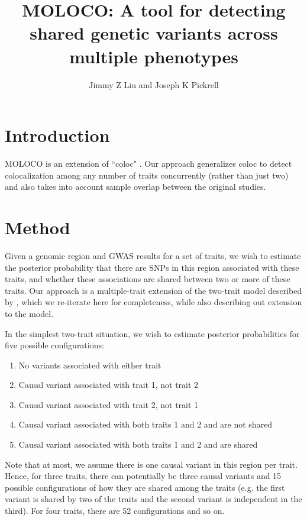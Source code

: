 \documentclass{article}
\begin{document}
\title{MOLOCO: A tool for detecting shared genetic variants across multiple phenotypes}
\author{Jimmy Z Liu and Joseph K Pickrell}
\maketitle


\section{Introduction}
MOLOCO is an extension of ``coloc" \citep{Giambartolomei:2014aa}. Our approach generalizes coloc to detect colocalization among any number of traits concurrently (rather than just two) and also takes into account sample overlap between the original studies.


\section{Method}

Given a genomic region and GWAS results for a set of traits, we wish to estimate the posterior probability that there are SNPs in this region associated with these traits, and whether these associations are shared between two or more of these traits. Our approach is a multiple-trait extension of the two-trait model described by \cite{Giambartolomei:2014aa}, which we re-iterate here for completeness, while also describing out extension to the model.

In the simplest two-trait situation, we wish to estimate posterior probabilities for five possible configurations:
\begin{enumerate}[start=0]
  \item No variants associated with either trait
  \item Causal variant associated with trait 1, not trait 2
  \item Causal variant associated with trait 2, not trait 1
  \item Causal variant associated with both traits 1 and 2 and are not shared
  \item Causal variant associated with both traits 1 and 2 and are shared
\end{enumerate}

\noindent Note that at most, we assume there is one causal variant in this region per trait. Hence, for three traits, there can potentially be three causal variants and 15 possible configurations of how they are shared among the traits (e.g. the first variant is shared by two of the traits and the second variant is independent in the third). For four traits, there are 52 configurations and so on.
\end{document}

